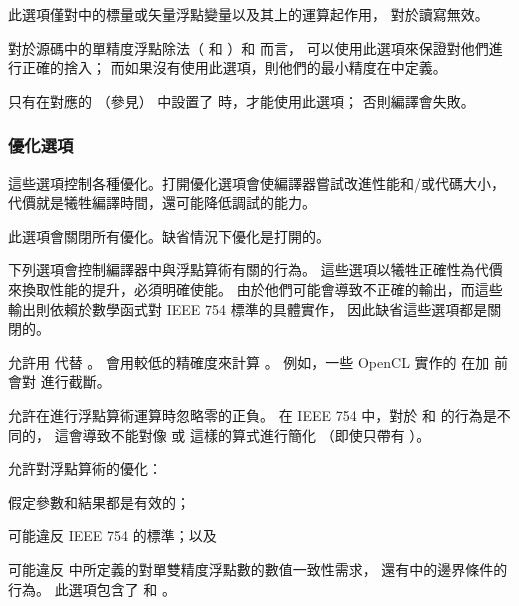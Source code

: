此選項僅對中的標量或矢量浮點變量以及其上的運算起作用，
對於讀寫無效。
\stopclOption

對於源碼中的單精度浮點除法（  和  ）和  而言，
可以使用此選項來保證對他們進行正確的捨入；
而如果沒有使用此選項，則他們的最小精度在中定義。

只有在對應的  （參見）
中設置了  時，才能使用此選項；
否則編譯會失敗。
\stopclOption

\subsubsection[sec:OptimizationOption]{優化選項}

這些選項控制各種優化。打開優化選項會使編譯器嘗試改進性能和/或代碼大小，
代價就是犧牲編譯時間，還可能降低調試的能力。

此選項會關閉所有優化。缺省情況下優化是打開的。
\stopclOption

下列選項會控制編譯器中與浮點算術有關的行為。
這些選項以犧牲正確性為代價來換取性能的提升，必須明確使能。
由於他們可能會導致不正確的輸出，而這些輸出則依賴於數學函式對 IEEE 754 標準的具體實作，
因此缺省這些選項都是關閉的。

允許用  代替 。
  會用較低的精確度來計算 。
例如，一些 OpenCL 實作的  在加  前會對  進行截斷。
\stopclOption

允許在進行浮點算術運算時忽略零的正負。
在 IEEE 754 中，對於  和  的行為是不同的，
這會導致不能對像  或  這樣的算式進行簡化
（即使只帶有  ）。
\stopclOption

允許對浮點算術的優化：
\startigBase
\item 假定參數和結果都是有效的；
\item 可能違反 IEEE 754 的標準；以及
\item 可能違反 中所定義的對單雙精度浮點數的數值一致性需求，
還有中的邊界條件的行為。
\stopigBase
此選項包含了  和 。
\stopclOption

